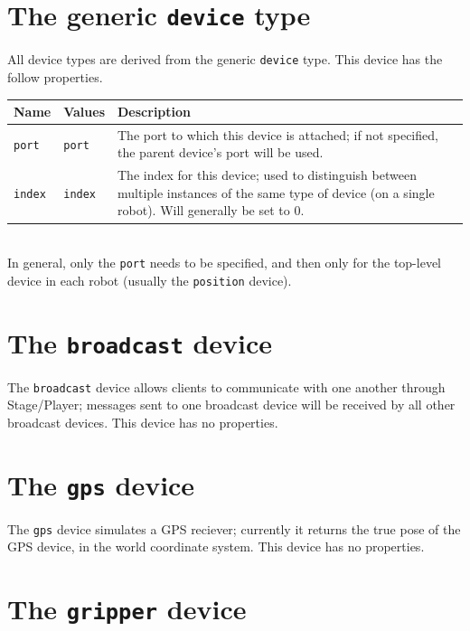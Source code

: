 \documentclass[11pt]{report}
\begin{document}
\newpage
\section{The generic {\tt device} type}

All device types are derived from the generic \verb'device' type.
This device has the follow properties.
\vspace{1em}\\\noindent
\begin{tabularx}{\columnwidth}{llX}
\hline
Name & Values & Description \\
\hline

\verb'port' & \verb'port' & The port to which this device is attached;
if not specified, the parent device's port will be used.\\

\verb'index' & \verb'index' & The index for this device; used to
distinguish between multiple instances of the same type of device (on
a single robot).  Will generally be set to 0.\\

\hline
\end{tabularx}
\vspace{1em}\\
\noindent In general, only the \verb'port' needs to be specified, and
then only for the top-level device in each robot (usually the
\verb'position' device).


\newpage
\section{The {\tt broadcast} device}

The {\tt broadcast} device allows clients to communicate with one
another through Stage/Player; messages sent to one broadcast device
will be received by all other broadcast devices.  This device has no
properties.


\newpage
\section{The {\tt gps} device}

The {\tt gps} device simulates a GPS reciever; currently it returns
the true pose of the GPS device, in the world coordinate system.  This
device has no properties.


\newpage
\section{The {\tt gripper} device}
\end{document}
